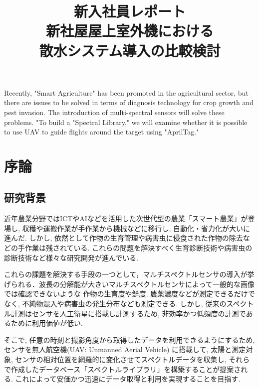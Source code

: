 \documentclass[a4j,fleqn,dvipdfmx,uplatex]{jsarticle}
\begin{document}
%
\title{新入社員レポート\\新社屋屋上室外機における\\散水システム導入の比較検討} %
\etitle{} %
\abst
{Recently, "Smart Agriculture" has been promoted in the agricultural sector, but there are issues to be solved in terms of diagnosis technology 
for crop growth and pest invasion. The introduction of multi-spectral sensors will solve these problems. 
"To build a "Spectral Library," we will examine whether it is possible to use UAV to guide flights around the target using "AprilTag."}

\maketitle
\section{序論}\label{sec1}
\subsection{研究背景}\label{background}
近年農業分野ではICTやAIなどを活用した次世代型の農業「スマート農業\cite{SmartAgri}」が登場し, 収穫や運搬作業が手作業から機械などに移行し, 自動化・省力化が大いに進んだ. 
しかし, 依然として作物の生育管理や病害虫に侵食された作物の除去などの手作業は残されている. 
これらの問題を解決すべく生育診断技術や病害虫の診断技術など様々な研究開発が進んでいる\cite{SMART_AGRI}. 

これらの課題を解決する手段の一つとして，マルチスペクトルセンサの導入が挙げられる．波長の分解能が大きいマルチスペクトルセンサによって一般的な画像では確認できないような
作物の生育度や鮮度, 農薬濃度などが測定できるだけでなく, 不純物混入や病害虫の発生分布なども測定できる\cite{HS}. 
しかし, 従来のスペクトル計測はセンサを人工衛星に搭載し計測するため, 非効率かつ低頻度の計測であるために利用価値が低い. 

そこで, 任意の時刻と撮影角度から取得したデータを利用できるようにするため, センサを無人航空機(UAV: Unmanned Aerial Vehicle) に搭載して, 
太陽と測定対象, センサの相対位置を網羅的に変化させてスペクトルデータを収集し, それらで作成したデータベース「スペクトルライブラリ」を構築することが提案される. 
これによって安価かつ迅速にデータ取得と利用を実現することを目指す.
\end{document}
